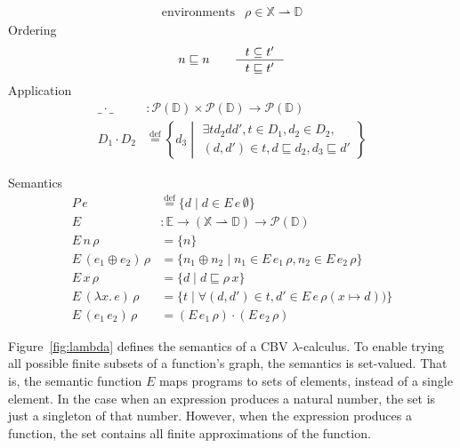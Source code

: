 \documentclass{tufte-handout}
\newcommand{\defeq}[0]{\overset{\mathrm{def}}{=}}
\newcommand{\LAM}[1]{\lambda #1.\,}
\newcommand{\pto}[0]{\rightharpoonup}
\newcommand{\VAR}[0]{\mathbb{X}}
\newcommand{\ext}[3]{#3(#1{\mapsto}#2)}
\begin{document}
\begin{figure*}[tbp]
  \begin{minipage}{0.5\textwidth}
\[
\begin{array}{lrl}
  \text{environments} & \rho \in  \VAR \pto \mathbb{D} 
\end{array}
\]
Ordering
\[
   n \sqsubseteq n \qquad 
   \inference{t \subseteq t'}{t \sqsubseteq t'}
\]
Application
\begin{align*}
  \_ \cdot \_ &: \mathcal{P}(\mathbb{D}) \times \mathcal{P}(\mathbb{D})\to \mathcal{P}(\mathbb{D}) \\
  D_1 \cdot D_2 & \defeq
    \left\{ d_3 \middle|
    \begin{array}{l}
      \exists t d_2 d d', t \in D_1,  d_2 \in D_2, \\
      (d,d') \in t, d \sqsubseteq d_2, d_3 \sqsubseteq d'
    \end{array}
    \right\}
\end{align*}
\end{minipage}
\begin{minipage}{0.5\textwidth}
Semantics
\begin{align*}
  P\,e &\defeq \{ d \mid d \in E\,e\,\emptyset\} \\[1ex]
  E & : \mathbb{E} \to (\VAR \pto \mathbb{D}) \to \mathcal{P}(\mathbb{D})\\
  E\, n \, \rho & = \{ n \} \\
  E\, (e_1 \oplus e_2) \, \rho & = \{ n_1 \oplus n_2 \mid n_1 \in E\,e_1\,\rho, 
                                    n_2 \in E\,e_2\,\rho \} \\
  E\, x \,\rho &= \{ d \mid d \sqsubseteq \rho\,x \} \\
  E\, (\LAM{x}e)\,\rho &= 
      \{ t \mid \forall (d,d') \in t, d' \in E\,e\,\ext{x}{ d}{\rho}) \} \\
  E\, (e_1\,e_2)\,\rho &= (E\,e_1\,\rho) \cdot (E\,e_2\,\rho)
\end{align*}
\end{minipage}
\caption{Semantics of the $\lambda$-calculus}
\label{fig:lambda}
\end{figure*}

Figure~\ref{fig:lambda} defines the semantics of a CBV
$\lambda$-calculus. To enable trying all possible finite subsets of a
function's graph, the semantics is set-valued. That is, the semantic
function $E$ maps programs to sets of elements, instead of a single
element. In the case when an expression produces a natural number, the
set is just a singleton of that number. However, when the expression
produces a function, the set contains all finite approximations of the
function.
\end{document}
